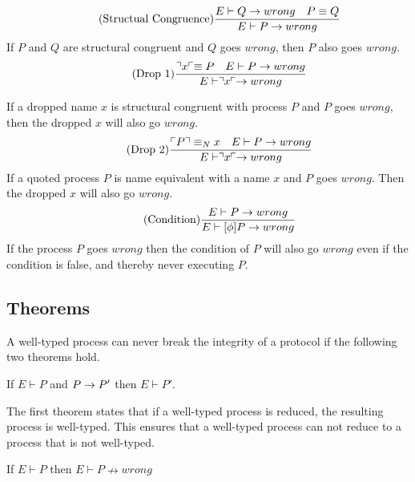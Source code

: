     \begin{align*}
        \tag{Structual Congruence}\frac{E \vdash Q \rightarrow wrong \quad P \equiv Q}{E \vdash P \rightarrow wrong}
    \end{align*}
    If $P$ and $Q$ are structural congruent and $Q$ goes $wrong$, then $P$ also goes $wrong$.\\

    \begin{align*}
        \tag{Drop 1}\frac{\urcorner x \ulcorner \equiv P \quad E \vdash P \rightarrow wrong}{E \vdash \urcorner x \ulcorner \rightarrow wrong}
    \end{align*}
    
    If a dropped name $x$ is structural congruent with process $P$ and $P$ goes $wrong$, then the dropped $x$ will also go $wrong$.\\

    \begin{align*}
        \tag{Drop 2}\frac{\ulcorner P \urcorner \equiv _N x \quad E \vdash P \rightarrow wrong}{E \vdash \urcorner x \ulcorner \rightarrow wrong}
    \end{align*}
    If a quoted process $P$ is name equivalent with a name $x$ and $P$ goes $wrong$. Then the dropped $x$ will also go $wrong$.\\

    \begin{align*}
        \tag{Condition}\frac{E \vdash P \rightarrow wrong}{E \vdash [\phi]P \rightarrow wrong}
    \end{align*}
    If the process $P$ goes $wrong$ then the condition of $P$ will also go $wrong$ even if the condition is false, and thereby never executing $P$.


\subsection{Theorems}
A well-typed process can never break the integrity of a protocol if the following two theorems hold.

\begin{theorem}
	If $E \vdash P$ and $P\rightarrow P'$ then $E \vdash P'$.
\end{theorem}

The first theorem states that if a well-typed process is reduced, the resulting process is well-typed. This ensures that a well-typed process can not reduce to a process that is not well-typed.

\begin{theorem}
	If $E \vdash P$ then $E \vdash P \nrightarrow wrong$
\end{theorem}


